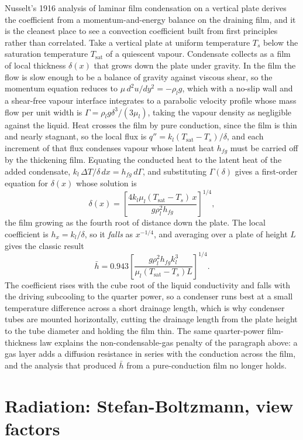 \begin{mastery}
Nusselt's 1916 analysis of laminar film condensation on a vertical plate
derives the coefficient from a momentum-and-energy balance on the draining
film, and it is the cleanest place to see a convection coefficient built
from first principles rather than correlated. Take a vertical plate at
uniform temperature $T_s$ below the saturation temperature $T_{\text{sat}}$
of a quiescent vapour. Condensate collects as a film of local thickness
$\delta(x)$ that grows down the plate under gravity. In the film the flow
is slow enough to be a balance of gravity against viscous shear, so the
momentum equation reduces to $\mu\,d^2u/dy^2 = -\rho_l g$, which with a
no-slip wall and a shear-free vapour interface integrates to a parabolic
velocity profile whose mass flow per unit width is $\Gamma = \rho_l g
\delta^3/(3\mu_l)$, taking the vapour density as negligible against the
liquid. Heat crosses the film by pure conduction, since the film is thin
and nearly stagnant, so the local flux is $q'' = k_l(T_{\text{sat}} -
T_s)/\delta$, and each increment of that flux condenses vapour whose latent
heat $h_{fg}$ must be carried off by the thickening film. Equating the
conducted heat to the latent heat of the added condensate, $k_l\,\Delta T/
\delta\,dx = h_{fg}\,d\Gamma$, and substituting $\Gamma(\delta)$ gives a
first-order equation for $\delta(x)$ whose solution is
\[
\delta(x) = \left[\frac{4 k_l \mu_l (T_{\text{sat}} - T_s)\,x}{g \rho_l^2
h_{fg}}\right]^{1/4},
\]
the film growing as the fourth root of distance down the plate. The local
coefficient is $h_x = k_l/\delta$, so it \emph{falls} as $x^{-1/4}$, and
averaging over a plate of height $L$ gives the classic result
\[
\bar{h} = 0.943\left[\frac{g \rho_l^2 h_{fg} k_l^3}{\mu_l (T_{\text{sat}} -
T_s) L}\right]^{1/4}.
\]
The coefficient rises with the cube root of the liquid conductivity and
falls with the driving subcooling to the quarter power, so a condenser runs
best at a small temperature difference across a short drainage length, which
is why condenser tubes are mounted horizontally, cutting the drainage length
from the plate height to the tube diameter and holding the film thin. The
same quarter-power film-thickness law explains the non-condensable-gas
penalty of the paragraph above: a gas layer adds a diffusion resistance in
series with the conduction across the film, and the analysis that produced
$\bar{h}$ from a pure-conduction film no longer holds.
\end{mastery}

\section{Radiation: Stefan-Boltzmann, view factors}

